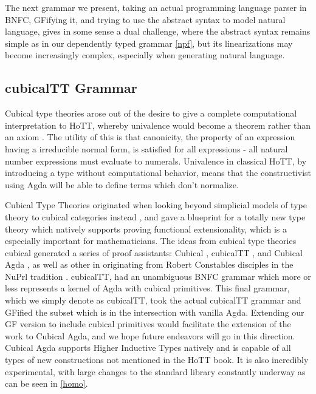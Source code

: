 The next grammar we present, taking an actual programming language parser in
BNFC, GFifying it, and trying to use the abstract syntax to model natural
language, gives in some sense a dual challenge, where the abstract syntax
remains simple as in our dependently typed grammar \ref{npf}, but its
linearizations may become increasingly complex, especially when generating
natural language.

\subsection{cubicalTT Grammar} \label{cubic}

Cubical type theories arose out of the desire to give a complete computational
interpretation to HoTT, whereby univalence would become a theorem rather than an
axiom \cite{cohen:hal-01378906}. The utility of this is that canonicity, the
property of an expression having a irreducible normal form, is satisfied for all
expressions - all natural number expressions must evaluate to numerals.
Univalence in classical HoTT, by introducing a type without computational
behavior, means that the constructivist using Agda will be able to define terms
which don't normalize.

Cubical Type Theories originated when looking beyond simplicial models of type
theory to cubical categories instead \cite{bezem2017univalence}, and gave a
blueprint for a totally new type theory which natively supports proving
functional extensionality, which is a especially important for mathematicians.
The ideas from cubical type theories cubical generated a series of proof
assistants: Cubical \cite{huberCub}, cubicalTT \cite{cubicaltt}, and Cubical
Agda \cite{cubicalAgda}, as well as other in originating from Robert Constables
disciples in the NuPrl tradition \cite{Angiuli_2018} \cite{redTT} \cite{coolTT}.
cubicalTT, had an unambiguous BNFC grammar which more or less represents a
kernel of Agda with cubical primitives. This final grammar, which we simply
denote as cubicalTT, took the actual cubicalTT grammar and GFified the subset
which is in the intersection with vanilla Agda. Extending our GF version to
include cubical primitives would facilitate the extension of the work to Cubical
Agda, and we hope future endeavors will go in this direction. Cubical Agda
supports Higher Inductive Types \cite{hits} natively and is capable of all types
of new constructions not mentioned in the HoTT book. It is also incredibly
experimental, with large changes to the standard library constantly underway as
can be seen in \ref{homo}.

